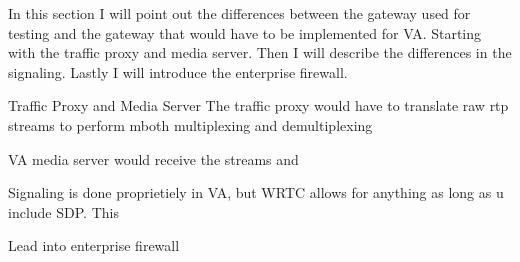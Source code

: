 In this section I will point out the differences between the gateway used for testing and the gateway that would have to be implemented for VA. Starting with the traffic proxy and media server. Then I will describe the differences in the signaling. Lastly I will introduce the enterprise firewall.

Traffic Proxy and Media Server
The traffic proxy would have to translate raw rtp streams to perform mboth multiplexing and demultiplexing

VA media server would receive the streams and 

Signaling
is done proprietiely in VA, but WRTC allows for anything as long as u include SDP. This

Lead into enterprise firewall
